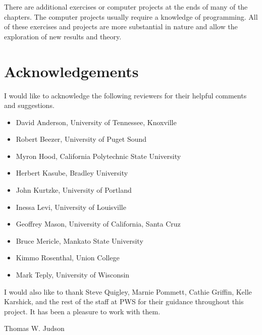 There are additional exercises or computer projects at the ends of
many of the chapters. The computer projects usually require a
knowledge of programming. All of these exercises and projects are more
substantial in nature and allow the exploration of new results and
theory.
 

 
 

 
 
 
 
 
 
 
 
 
 
 
 

 
\section*{Acknowledgements}
 
 
I would like to acknowledge the following reviewers for their helpful
comments and suggestions. 
\begin{itemize}
 
\item
David Anderson,
University of Tennessee, Knoxville

\item
Robert Beezer,
University of Puget Sound

\item
Myron Hood,
California Polytechnic State University

\item
Herbert Kasube,
Bradley University

\item
John Kurtzke,
University of Portland
 
\item
Inessa Levi,
University of Louisville
 
\item
Geoffrey Mason,
University of California, Santa Cruz

\item
Bruce Mericle,
Mankato State University
 
\item
Kimmo Rosenthal,
Union College

\item
Mark Teply,
University of Wisconsin

\end{itemize}
I would also like to thank Steve Quigley, Marnie Pommett, Cathie
Griffin, Kelle Karshick, and the rest of the staff at PWS for their
guidance throughout this project. It has been a pleasure to work with
them. 

 
\begin{flushright}
Thomas W. Judson
\end{flushright}
 
 
\pagestyle{headings}
 
 
 
 
